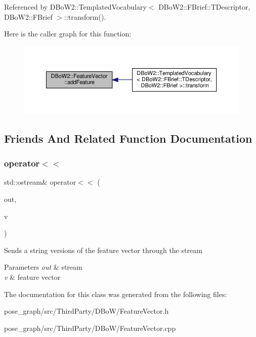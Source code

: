 Referenced by D\+Bo\+W2\+::\+Templated\+Vocabulary$<$ D\+Bo\+W2\+::\+F\+Brief\+::\+T\+Descriptor, D\+Bo\+W2\+::\+F\+Brief $>$\+::transform().

Here is the caller graph for this function\+:\nopagebreak
\begin{figure}[H]
\begin{center}
\leavevmode
\includegraphics[width=350pt]{classDBoW2_1_1FeatureVector_ae9554bfcbebc85439616de08f47f2238_icgraph}
\end{center}
\end{figure}


\subsection{Friends And Related Function Documentation}
\mbox{\label{classDBoW2_1_1FeatureVector_a34aa65c93dc5f6be269610e3f238d9b1}} 
\subsubsection{\texorpdfstring{operator$<$$<$}{operator<<}}
{\footnotesize\ttfamily std\+::ostream\& operator$<$$<$ (\begin{DoxyParamCaption}\item[{std\+::ostream \&}]{out,  }\item[{const \hyperlink{classDBoW2_1_1FeatureVector}{Feature\+Vector} \&}]{v }\end{DoxyParamCaption})\hspace{0.3cm}{\ttfamily [friend]}}

Sends a string versions of the feature vector through the stream 
\begin{DoxyParams}{Parameters}
{\em out} & stream \\
\hline
{\em v} & feature vector \\
\hline
\end{DoxyParams}


The documentation for this class was generated from the following files\+:\begin{DoxyCompactItemize}
\item 
pose\+\_\+graph/src/\+Third\+Party/\+D\+Bo\+W/Feature\+Vector.\+h\item 
pose\+\_\+graph/src/\+Third\+Party/\+D\+Bo\+W/Feature\+Vector.\+cpp\end{DoxyCompactItemize}

